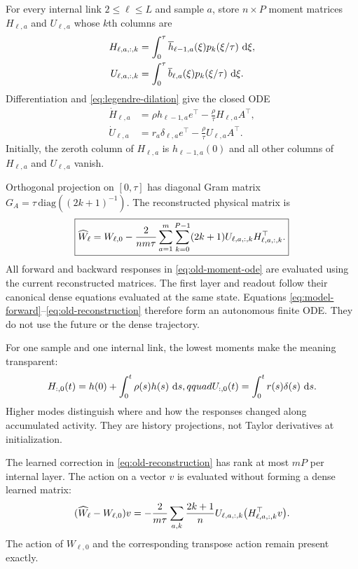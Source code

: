For every internal link $2\le\ell\le L$ and sample $a$, store $n\times P$
moment matrices $H_{\ell,a}$ and $U_{\ell,a}$ whose $k$th columns are
\begin{align}
H_{\ell,a,:,k}&=\int_0^\tau
 \overline h_{\ell-1,a}(\xi)p_k(\xi/\tau)\,\mathop{}\!\mathrm d\xi,\nonumber\\
U_{\ell,a,:,k}&=\int_0^\tau
 \overline b_{\ell,a}(\xi)p_k(\xi/\tau)\,\mathop{}\!\mathrm d\xi .
\label{eq:old-moments}
\end{align}
Differentiation and \eqref{eq:legendre-dilation} give the closed ODE
\begin{align}
\dot H_{\ell,a}&=\rho h_{\ell-1,a}e^\top
             -\frac{\rho}{\tau}H_{\ell,a}A^\top,\nonumber\\
\dot U_{\ell,a}&=r_a\delta_{\ell,a}e^\top
             -\frac{\rho}{\tau}U_{\ell,a}A^\top.
\label{eq:old-moment-ode}
\end{align}
Initially, the zeroth column of $H_{\ell,a}$ is $h_{\ell-1,a}(0)$ and
all other columns of $H_{\ell,a}$ and $U_{\ell,a}$ vanish.

Orthogonal projection on $[0,\tau]$ has diagonal Gram matrix
$G_A=\tau\,\mathrm{diag}((2k+1)^{-1})$.  The reconstructed physical matrix is
\begin{equation}
 \boxed{
 \widehat W_\ell=W_{\ell,0}
 -\frac{2}{nm\tau}\sum_{a=1}^m\sum_{k=0}^{P-1}(2k+1)
 U_{\ell,a,:,k}H_{\ell,a,:,k}^\top .}
 \label{eq:old-reconstruction}
\end{equation}
All forward and backward responses in \eqref{eq:old-moment-ode} are evaluated
using the current reconstructed matrices.  The first layer and readout follow
their canonical dense equations evaluated at the same state.  Equations
\eqref{eq:model-forward}--\eqref{eq:old-reconstruction} therefore form an
autonomous finite ODE.  They do not use the future or the dense trajectory.

For one sample and one internal link, the lowest moments make the meaning
transparent:
\begin{equation}
 H_{:,0}(t)=h(0)+\int_0^t\rho(s)h(s)\,\mathop{}\!\mathrm d s,qquad
 U_{:,0}(t)=\int_0^t r(s)\delta(s)\,\mathop{}\!\mathrm d s.
\end{equation}
Higher modes distinguish where and how the responses changed along accumulated
activity.  They are history projections, not Taylor derivatives at
initialization.

The learned correction in \eqref{eq:old-reconstruction} has rank at most
$mP$ per internal layer.  The action on a vector $v$ is evaluated without
forming a dense learned matrix:
\begin{equation}
 (\widehat W_\ell-W_{\ell,0})v
 =-\frac{2}{m\tau}\sum_{a,k}\frac{2k+1}{n}
 U_{\ell,a,:,k}\bigl(H_{\ell,a,:,k}^\top v\bigr).
 \label{eq:factor-action}
\end{equation}
The action of $W_{\ell,0}$ and the corresponding transpose action remain
present exactly.

